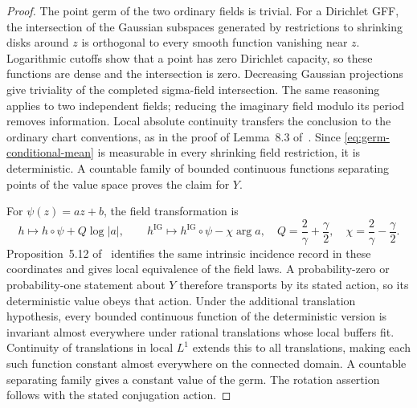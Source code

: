 \begin{proof}
The point germ of the two ordinary fields is trivial.  For a Dirichlet
GFF, the intersection of the Gaussian subspaces generated by
restrictions to shrinking disks around \(z\) is orthogonal to every
smooth function vanishing near \(z\).  Logarithmic cutoffs show that a
point has zero Dirichlet capacity, so these functions are dense and the
intersection is zero.  Decreasing Gaussian projections give triviality
of the completed sigma-field intersection.  The same reasoning applies
to two independent fields; reducing the imaginary field modulo its
period removes information.  Local absolute continuity transfers the
conclusion to the ordinary chart conventions, as in the proof of
Lemma~8.3 of~\cite{C}.  Since \eqref{eq:germ-conditional-mean} is
measurable in every shrinking field restriction, it is deterministic.
A countable family of bounded continuous functions separating points
of the value space proves the claim for \(Y\).

For \(\psi(z)=az+b\), the field transformation is
\begin{equation}
 h\longmapsto h\circ\psi+Q\log|a|,
 \qquad
 h^{\mathrm{IG}}\longmapsto
 h^{\mathrm{IG}}\circ\psi-\chi\arg a,
 \quad
 Q=\frac2\gamma+\frac\gamma2,\quad
 \chi=\frac2\gamma-\frac\gamma2 .
 \label{eq:affine-fields}
\end{equation}
Proposition~5.12 of~\cite{C} identifies the same intrinsic incidence
record in these coordinates and gives local equivalence of the field
laws.  A probability-zero or probability-one statement about \(Y\)
therefore transports by its stated action, so its deterministic value
obeys that action.  Under the additional translation hypothesis, every
bounded continuous function of the deterministic version is invariant
almost everywhere under rational translations whose local buffers fit.
Continuity of translations in local \(L^1\) extends this to all
translations, making each such function constant almost everywhere on
the connected domain.  A countable separating family gives a constant
value of the germ.  The rotation assertion follows with the stated
conjugation action.
\end{proof}
